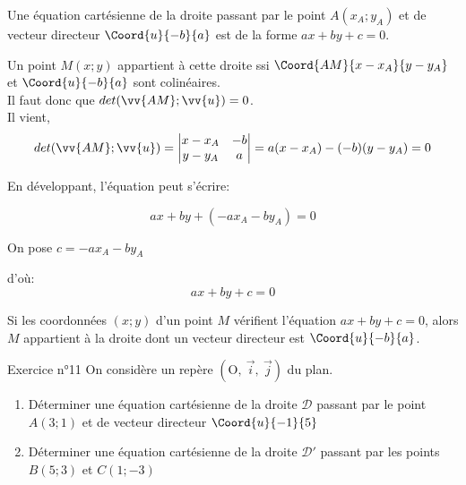 \documentclass[12pt,a4paper]{article}
\def\Oij{$\left(\text{O},~\vec{i},~\vec{j}\right)$}
\begin{document}
\begin{framed}
\vspace{3cm}
\end{framed}
\begin{pro}
Une équation cartésienne de la droite passant par le point $A(x_A;y_A)$ et de vecteur directeur $\Coord{u}{-b}{a}$ est de la forme $ax+by+c=0$.
\end{pro}

\begin{pf}
Un point $M(x;y)$ appartient à cette droite ssi $\Coord{AM}{x-x_A}{y-y_A}$ et $\Coord{u}{-b}{a}$ sont colinéaires.\\
Il faut donc que $det(\vv{AM};\vv{u})=0$.\\
Il vient, $$det(\vv{AM};\vv{u})=\begin{vmatrix} x-x_A & -b \\ y-y_A & a \end{vmatrix}=a(x-x_A)-(-b)(y-y_A)=0$$

En développant, l'équation peut s'écrire:

$$ax+by+(-ax_A-by_A)=0$$

On pose $c=-ax_A-by_A$

d'où: $$\boxed{ax+by+c=0}$$

\end{pf}



\begin{reci}
Si les coordonnées $(x;y)$ d'un point $M$ vérifient l'équation $ax+by+c=0$, alors $M$ appartient à la droite dont un vecteur directeur est $\Coord{u}{-b}{a}$.


\end{reci}

\begin{mybox}{Exercice n°11}
On considère un repère \Oij{} du plan.

\begin{enumerate}
    \item Déterminer une équation cartésienne de la droite $\mathscr{D}$ passant par le point $A(3;1)$ et de vecteur directeur $\Coord{u}{-1}{5}$
    \item Déterminer une équation cartésienne de la droite $\mathscr{D'}$ passant par les points $B(5;3)$ et $C(1;-3)$
\end{enumerate}

\end{mybox}
\end{document}
